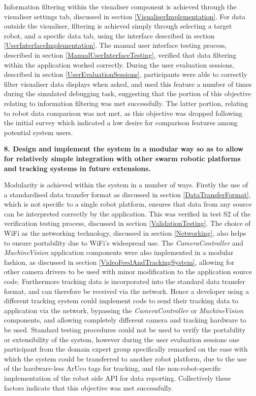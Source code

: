 Information filtering within the visualiser component is achieved through the visualiser settings tab, discussed in section \ref{VisualiserImplementation}. For data outside the visualiser, filtering is achieved simply through selecting a target robot, and a specific data tab, using the interface described in section \ref{UserInterfaceImplementation}. The manual user interface testing process, described in section \ref{ManualUserInterfaceTesting}, verified that data filtering within the application worked correctly. During the user evaluation sessions, described in section \ref{UserEvaluationSessions}, participants were able to correctly filter visualiser data displays when asked, and used this feature a number of times during the simulated debugging task, suggesting that the portion of this objective relating to information filtering was met successfully. The latter portion, relating to robot data comparison was not met, as this objective was dropped following the initial survey which indicated a low desire for comparison features among potential system users.

\noindent \textbf{8. Design and implement the system in a modular way so as to allow for relatively simple integration with other swarm robotic platforms and tracking systems in future extensions.}

Modularity is achieved within the system in a number of ways. Firstly the use of a standardised data transfer format as discussed in section \ref{DataTransferFormat}, which is not specific to a single robot platform, ensures that data from any source can be interpreted correctly by the application. This was verified in test S2 of the verification testing process, discussed in section \ref{ValidationTesting}. The choice of WiFi as the networking technology, discussed in section \ref{Networking}, also helps to ensure portability due to WiFi's widespread use. The \textit{CameraController} and \textit{MachineVision} application components were also implemented in a modular fashion, as discussed in section \ref{VideoFeedAndTrackingSystem}, allowing for other camera drivers to be used with minor modification to the application source code. Furthermore tracking data is incorporated into the standard data transfer format, and can therefore be received via the network. Hence a developer using a different tracking system could implement code to send their tracking data to application via the network, bypassing the \textit{CameraController} or \textit{MachineVision} components, and allowing completely different camera and tracking hardware to be used. Standard testing procedures could not be used to verify the portability or extensibility of the system, however during the user evaluation sessions one participant from the domain expert group specifically remarked on the ease with which the system could be transferred to another robot platform, due to the use of the hardware-less ArUco tags for tracking, and the non-robot-specific implementation of the robot side API for data reporting. Collectively these factors indicate that this objective was met successfully.

